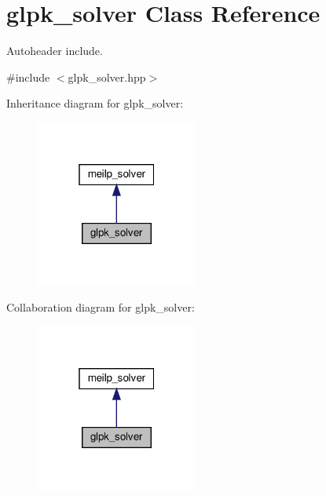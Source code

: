 \hypertarget{classglpk__solver}{}\section{glpk\+\_\+solver Class Reference}
\label{classglpk__solver}


Autoheader include.  




{\ttfamily \#include $<$glpk\+\_\+solver.\+hpp$>$}



Inheritance diagram for glpk\+\_\+solver\+:
\nopagebreak
\begin{figure}[H]
\begin{center}
\leavevmode
\includegraphics[width=151pt]{d1/d07/classglpk__solver__inherit__graph}
\end{center}
\end{figure}


Collaboration diagram for glpk\+\_\+solver\+:
\nopagebreak
\begin{figure}[H]
\begin{center}
\leavevmode
\includegraphics[width=151pt]{d1/dd8/classglpk__solver__coll__graph}
\end{center}
\end{figure}
